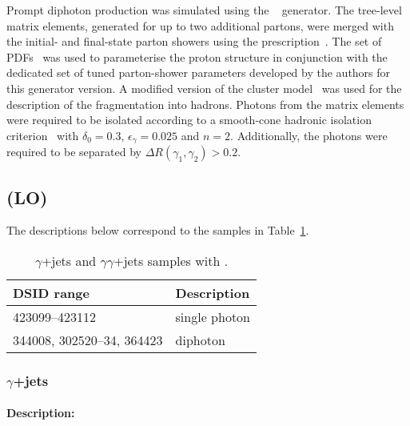 Prompt diphoton production was simulated using the \SHERPA[2.1]~\cite{Bothmann:2019yzt}
generator. The tree-level matrix elements, generated for up to two
additional partons, were merged with the initial- and final-state parton showers using the
\MEPSatLO prescription~\cite{Hoeche:2009rj}. The \CT[10nlo] set of PDFs~\cite{Lai:2010vv} was
used to parameterise the proton structure in conjunction with the dedicated set of tuned
parton-shower parameters developed by the \SHERPA authors for this generator version. A
modified version of the cluster model~\cite{Winter:2003tt} was used
for the description of the fragmentation into hadrons. Photons from the matrix elements were
required to be isolated according to a smooth-cone hadronic isolation criterion~\cite{Frixione:1998jh}
with $\delta_0=0.3$, $\epsilon_{\gamma}=0.025$ and $n=2$. Additionally, the photons were 
required to be separated by $\Delta R(\gamma_1,\gamma_2) > 0.2$.


\subsection[Pythia (LO)]{\PYTHIA (LO)}

The descriptions below correspond to the samples in Table~\ref{tab:gammajets-pythia-lo}.

\begin{table}[!htbp]
  \caption{$\gamma$+jets and  $\gamma\gamma$+jets samples with \PYTHIA.}%
  \label{tab:gammajets-pythia-lo}
  \centering
  \begin{tabular}{l l}
    \toprule
    DSID range & Description \\
    \midrule
    423099--423112 & single photon \\
    344008, 302520--34, 364423 & diphoton \\
    \bottomrule
  \end{tabular}
\end{table}


\subsubsection[y+jets]{$\gamma$+jets}

\paragraph{Description:}

